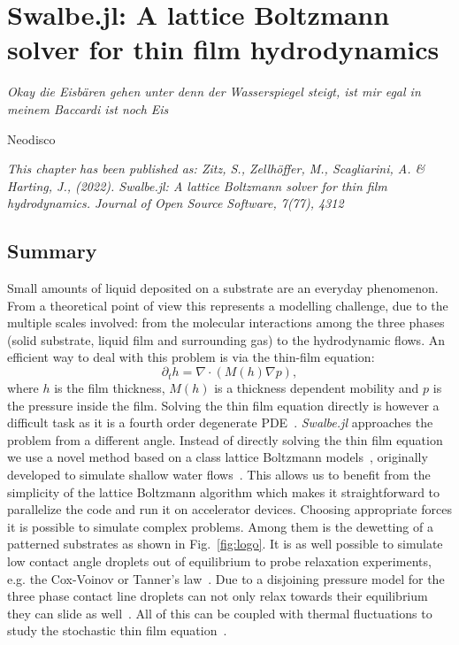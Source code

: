 \chapter{Swalbe.jl: A lattice Boltzmann solver for thin film hydrodynamics}
\label{chapter:fourth_paper}
\epigraph{\textit{Okay die Eisbären gehen unter denn der Wasserspiegel steigt, ist mir egal in meinem Baccardi ist noch Eis}}{Neodisco}

\textit{\small{This chapter has been published as: Zitz, S., Zellh\"{o}ffer, M., Scagliarini, A. \& Harting, J., (2022). Swalbe.jl: A lattice Boltzmann solver for thin film hydrodynamics. Journal of Open Source Software, 7(77), 4312}}

\section{Summary}
\label{sec:Joss_sum}
Small amounts of liquid deposited on a substrate are an everyday phenomenon.
From a theoretical point of view this represents a modelling challenge, due to the multiple scales involved: from the molecular interactions among the three phases (solid substrate, liquid film and surrounding gas) to the hydrodynamic flows.
An efficient way to deal with this problem is via the thin-film equation:
\begin{equation}\label{eq:thin_film_Joss}
    \partial_t h = \nabla\cdot(M(h)\nabla p),
\end{equation}
where $h$ is the film thickness, $M(h)$ is a thickness dependent mobility and $p$ is the pressure inside the film.
Solving the thin film equation directly is however a difficult task as it is a fourth order degenerate PDE~\cite{beckerComplexDewettingScenarios2003}.
\textit{Swalbe.jl} approaches the problem from a different angle.
Instead of directly solving the thin film equation we use a novel method based on a class lattice Boltzmann models~\cite{krugerLatticeBoltzmannMethod2017}, originally developed to simulate shallow water flows~\cite{salmonLatticeBoltzmannMethod1999}.
This allows us to benefit from the simplicity of the lattice Boltzmann algorithm which makes it straightforward to parallelize the code and run it on accelerator devices.
Choosing appropriate forces it is possible to simulate complex problems.
Among them is the dewetting of a patterned substrates as shown in Fig.~\ref{fig:logo}.
It is as well possible to simulate low contact angle droplets out of equilibrium to probe relaxation experiments, e.g. the Cox-Voinov or Tanner's law~\cite{bonnWettingSpreading2009}.
Due to a disjoining pressure model for the three phase contact line droplets can not only relax towards their equilibrium they can slide as well~\cite{zitzLatticeBoltzmannMethod2019}.
All of this can be coupled with thermal fluctuations to study the stochastic thin film equation~\cite{shahThermalFluctuationsCapillary2019}.

